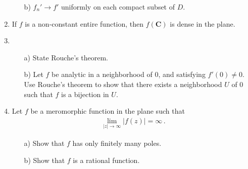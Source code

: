 \documentclass[11pt]{amsart}
\theoremstyle{plain}
\theoremstyle{definition}
\theoremstyle{remark}
\begin{document}
\begin{enumerate}
\begin{itemize}
        \item[b)] $f_n' \to f'$ uniformly on each compact subset of $D$.
    \end{itemize}
    
    \item If $f$ is a non-constant entire function, then $f(\mathbf{C})$ is dense in the plane.
    
    \item \begin{enumerate}
        \item[a)] State Rouche's theorem.
        \item[b)] Let $f$ be analytic in a neighborhood of $0$, and satisfying $f'(0) \neq 0$. Use Rouche's theorem to show that there exists a neighborhood $U$ of $0$ such that $f$ is a bijection in $U$.
    \end{enumerate}
    
    \item Let $f$ be a meromorphic function in the plane such that
   \begin{align*}
       \lim_{|z|\to\infty} |f(z)| = \infty \, .
   \end{align*}
   \begin{enumerate}
       \item[a)] Show that $f$ has only finitely many poles.
       \item[b)] Show that $f$ is a rational function.
   \end{enumerate}
\end{enumerate}
\end{document}
